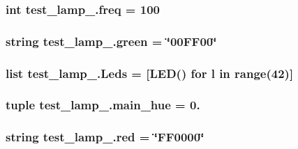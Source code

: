 \subsubsection[{freq}]{\setlength{\rightskip}{0pt plus 5cm}int test\+\_\+lamp\+\_.\+freq = 100}\label{namespacetest__lamp__2_ab35fca949f5807e379fd240b1f552dbb}
\hypertarget{namespacetest__lamp__2_ac7d7d6234740e9f61a277ad4cb312dc5}{}
\subsubsection[{green}]{\setlength{\rightskip}{0pt plus 5cm}string test\+\_\+lamp\+\_.\+green = \char`\"{}00\+F\+F00\char`\"{}}\label{namespacetest__lamp__2_ac7d7d6234740e9f61a277ad4cb312dc5}
\hypertarget{namespacetest__lamp__2_ade26824270e8518c4b82732d0cb1e38c}{}
\subsubsection[{Leds}]{\setlength{\rightskip}{0pt plus 5cm}list test\+\_\+lamp\+\_.\+Leds = \mbox{[}{\bf L\+E\+D}() for l in range(42)\mbox{]}}\label{namespacetest__lamp__2_ade26824270e8518c4b82732d0cb1e38c}
\hypertarget{namespacetest__lamp__2_a490769957edf0203bf54b6e8169f3b11}{}
\subsubsection[{main\+\_\+hue}]{\setlength{\rightskip}{0pt plus 5cm}tuple test\+\_\+lamp\+\_.\+main\+\_\+hue = 0.}\label{namespacetest__lamp__2_a490769957edf0203bf54b6e8169f3b11}
\hypertarget{namespacetest__lamp__2_a17152f1d5cbd5d9abe0446163c599058}{}
\subsubsection[{red}]{\setlength{\rightskip}{0pt plus 5cm}string test\+\_\+lamp\+\_.\+red = \char`\"{}F\+F0000\char`\"{}}\label{namespacetest__lamp__2_a17152f1d5cbd5d9abe0446163c599058}
\hypertarget{namespacetest__lamp__2_a589a584a123d57bac1e1f2b7103f583c}{}
